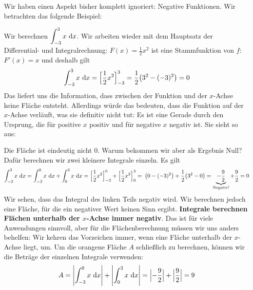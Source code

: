 \documentclass[../../main.tex]{subfiles}
\begin{document}
Wir haben einen Aspekt bisher komplett ignoriert: Negative Funktionen. Wir betrachten das folgende Beispiel:
\begin{example}{}
Wir berechnen $\displaystyle\int_{-3}^{3}x\mathop{}\mathrm{d} x$. Wir arbeiten wieder mit dem Hauptsatz der Differential- und Integralrechnung:
$F(x)=\frac{1}{2}x^2$ ist eine Stammfunktion von $f$: $F'(x)=x$ und deshalb gilt
\[\int_{-3}^{3}x\mathop{}\mathrm{d} x=\Bigl[\frac{1}{2}x^2\Bigr]_{-3}^3=\frac{1}{2}\bigl(3^2-(-3)^2\bigr)=0\]
Das liefert uns die Information, dass zwischen der Funktion und der $x$-Achse keine Fläche entsteht. Allerdings würde das bedeuten, dass die Funktion auf der $x$-Achse verläuft, was sie definitiv nicht tut: Es ist eine Gerade durch den Ursprung, die für positive $x$ positiv und für negative $x$ negativ ist. Sie sieht so aus:
\begin{center}
\end{center}
Die Fläche ist eindeutig nicht 0. Warum bekommen wir aber als Ergebnis Null? Dafür berechnen wir zwei kleinere Integrale einzeln. Es gilt
\[\int_{-3}^{3}x\mathop{}\mathrm{d} x=\int_{-3}^{0}x\mathop{}\mathrm{d} x+\int_{0}^{3}x\mathop{}\mathrm{d} x=\Bigl[\frac{1}{2}x^2\Bigr]_{-3}^0+\Bigl[\frac{1}{2}x^2\Bigr]_0^3=\frac{}{}\bigl(0-(-3)^2\bigr)+\frac{1}{2}\bigl(3^2-0\bigr)=\underbrace{-\frac{9}{2}}_{\text{Negativ!}}+\frac{9}{2}=0\]
Wir sehen, dass das Integral des linken Teils negativ wird. Wir berechnen jedoch eine Fläche, für die ein negativer Wert keinen Sinn ergibt. \textbf{Integrale berechnen Flächen unterhalb der $x$-Achse immer negativ}. Das ist für viele Anwendungen sinnvoll, aber für die Flächenberechnung müssen wir uns anders behelfen: Wir kehren das Vorzeichen immer, wenn eine Fläche unterhalb der $x$-Achse liegt, um. Um die orangene Fläche $A$ schließlich zu berechnen, können wir die Beträge der einzelnen Integrale verwenden:
\[A=\Biggl|\int_{-3}^{0}x\mathop{}\mathrm{d} x\Biggr|+\Biggl|\int_{0}^{3}x\mathop{}\mathrm{d} x\Biggr|=\Bigl|-\frac{9}{2}\Bigr|+\Bigl|\frac{9}{2}\Bigr|=9\]
\end{example}
\end{document}
